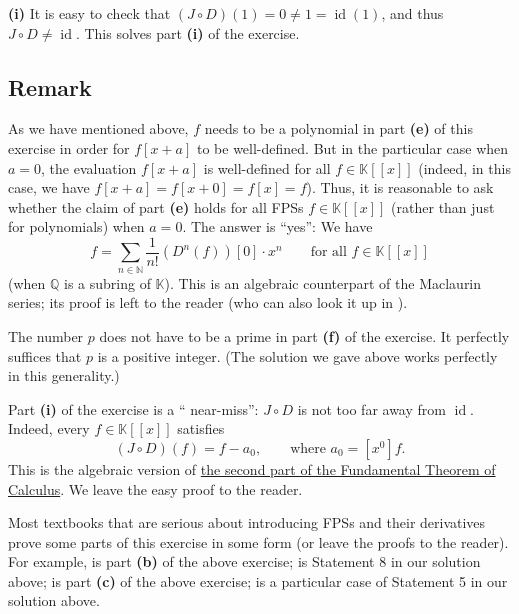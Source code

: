 \documentclass[paper=a4, fontsize=12pt]{scrartcl}%
\let\sumnonlimits\sum
\renewcommand{\sum}{\sumnonlimits\limits}
\theoremstyle{plainsl}
\theoremstyle{definition}
\theoremstyle{remark}
\begin{document}
\textbf{(i)} It is easy to check that $\left(  J\circ D\right)  \left(
1\right)  =0\neq1=\operatorname*{id}\left(  1\right)  $, and thus $J\circ
D\neq\operatorname*{id}$. This solves part \textbf{(i)} of the exercise.

\subsection{Remark}

As we have mentioned above, $f$ needs to be a polynomial in part \textbf{(e)}
of this exercise in order for $f\left[  x+a\right]  $ to be well-defined. But
in the particular case when $a=0$, the evaluation $f\left[  x+a\right]  $ is
well-defined for all $f\in\mathbb{K}\left[  \left[  x\right]  \right]  $
(indeed, in this case, we have $f\left[  x+a\right]  =f\left[  x+0\right]
=f\left[  x\right]  =f$). Thus, it is reasonable to ask whether the claim of
part \textbf{(e)} holds for all FPSs $f\in\mathbb{K}\left[  \left[  x\right]
\right]  $ (rather than just for polynomials) when $a=0$. The answer is
\textquotedblleft yes\textquotedblright: We have%
\[
f=\sum_{n\in\mathbb{N}}\dfrac{1}{n!}\left(  D^{n}\left(  f\right)  \right)
\left[  0\right]  \cdot x^{n}\qquad\text{for all }f\in\mathbb{K}\left[
\left[  x\right]  \right]
\]
(when $\mathbb{Q}$ is a subring of $\mathbb{K}$). This is an algebraic
counterpart of the Maclaurin series; its proof is left to the reader (who can
also look it up in \cite[Theorem 7.55]{Loehr-BC}).

\bigskip

The number $p$ does not have to be a prime in part \textbf{(f)} of the
exercise. It perfectly suffices that $p$ is a positive integer. (The solution
we gave above works perfectly in this generality.)

\bigskip

Part \textbf{(i)} of the exercise is a \textquotedblleft
near-miss\textquotedblright: $J\circ D$ is not too far away from
$\operatorname*{id}$. Indeed, every $f\in\mathbb{K}\left[  \left[  x\right]
\right]  $ satisfies%
\[
\left(  J\circ D\right)  \left(  f\right)  =f-a_{0},\qquad\text{where }%
a_{0}=\left[  x^{0}\right]  f.
\]
This is the algebraic version of
\href{https://en.wikipedia.org/wiki/Fundamental_theorem_of_calculus#Second_part}{the
second part of the Fundamental Theorem of Calculus}. We leave the easy proof
to the reader.

\bigskip

Most textbooks that are serious about introducing FPSs and their derivatives
prove some parts of this exercise in some form (or leave the proofs to the
reader). For example, \cite[Theorem 7.54 \textbf{(a)} and \textbf{(b)}%
]{Loehr-BC} is part \textbf{(b)} of the above exercise; \cite[Theorem 7.54
\textbf{(d)}]{Loehr-BC} is Statement 8 in our solution above; \cite[Theorem
7.54 \textbf{(e)}]{Loehr-BC} is part \textbf{(c)} of the above exercise;
\cite[Theorem 7.54 \textbf{(g)}]{Loehr-BC} is a particular case of Statement 5
in our solution above.
\end{document}
